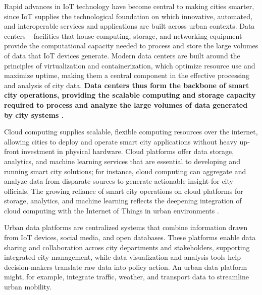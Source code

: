 \documentclass[journal]{IEEEtran}
\begin{document}
Rapid advances in IoT technology have become central to making cities smarter, since IoT supplies the technological foundation on which innovative, automated, and interoperable services and applications are built across urban contexts. Data centers -- facilities that house computing, storage, and networking equipment -- provide the computational capacity needed to process and store the large volumes of data that IoT devices generate. Modern data centers are built around the principles of virtualization and containerization, which optimize resource use and maximize uptime, making them a central component in the effective processing and analysis of city data. \textbf{Data centers thus form the backbone of smart city operations, providing the scalable computing and storage capacity required to process and analyze the large volumes of data generated by city systems \cite{r16}.}

Cloud computing supplies scalable, flexible computing resources over the internet, allowing cities to deploy and operate smart city applications without heavy up-front investment in physical hardware. Cloud platforms offer data storage, analytics, and machine learning services that are essential to developing and running smart city solutions; for instance, cloud computing can aggregate and analyze data from disparate sources to generate actionable insight for city officials. The growing reliance of smart city operations on cloud platforms for storage, analytics, and machine learning reflects the deepening integration of cloud computing with the Internet of Things in urban environments \cite{r10}.

Urban data platforms are centralized systems that combine information drawn from IoT devices, social media, and open databases. These platforms enable data sharing and collaboration across city departments and stakeholders, supporting integrated city management, while data visualization and analysis tools help decision-makers translate raw data into policy action. An urban data platform might, for example, integrate traffic, weather, and transport data to streamline urban mobility.
\end{document}
